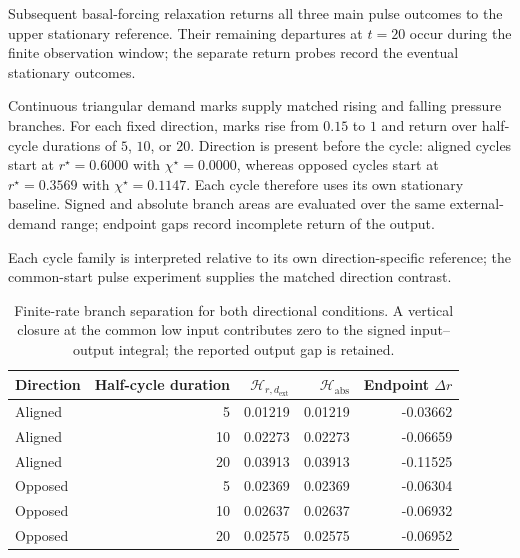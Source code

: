 Subsequent basal-forcing relaxation returns all three main pulse outcomes to the upper stationary reference. Their remaining departures at $t=20$ occur during the finite observation window; the separate return probes record the eventual stationary outcomes.

Continuous triangular demand marks supply matched rising and falling pressure branches. For each fixed direction, marks rise from $0.15$ to $1$ and return over half-cycle durations of $5$, $10$, or $20$. Direction is present before the cycle: aligned cycles start at $r^\star=0.6000$ with $\chi^\star=0.0000$, whereas opposed cycles start at $r^\star=0.3569$ with $\chi^\star=0.1147$. Each cycle therefore uses its own stationary baseline. Signed and absolute branch areas are evaluated over the same external-demand range; endpoint gaps record incomplete return of the output.

Each cycle family is interpreted relative to its own direction-specific reference; the common-start pulse experiment supplies the matched direction contrast.

\begin{table}[H]\centering\small

\begin{tabular}{@{}lrrrr@{}}\toprule

Direction & Half-cycle duration & $\mathcal H_{r,d_{\mathrm{ext}}}$ & $\mathcal H_{\mathrm{abs}}$ & Endpoint $\Delta r$ \\\midrule

Aligned & 5 & 0.01219 & 0.01219 & -0.03662 \\

Aligned & 10 & 0.02273 & 0.02273 & -0.06659 \\

Aligned & 20 & 0.03913 & 0.03913 & -0.11525 \\

Opposed & 5 & 0.02369 & 0.02369 & -0.06304 \\

Opposed & 10 & 0.02637 & 0.02637 & -0.06932 \\

Opposed & 20 & 0.02575 & 0.02575 & -0.06952 \\

\bottomrule\end{tabular}

\caption{Finite-rate branch separation for both directional conditions. A vertical closure at the common low input contributes zero to the signed input--output integral; the reported output gap is retained.}\label{tab:cycle-statistics}\end{table}

